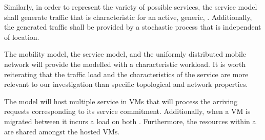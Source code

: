 Similarly, in order to represent the variety of possible services, the service model shall generate traffic that is characteristic for an active, generic, \ue{}. Additionally, the generated traffic shall be provided by a stochastic process that is independent of location.

The mobility model, the service model, and the uniformly distributed mobile network will provide the modelled \dcs{} with a characteristic workload. It is worth reiterating that the traffic load and the characteristics of the service are more relevant to our investigation than specific topological and network properties.

The \dc{} model will host multiple service in VMs that will process the arriving requests corresponding to its service commitment. Additionally, when a VM is migrated between \dcs{} it incurs a load on both \dcs{}. Furthermore, the resources within a \dc{} are shared amongst the hosted VMs. %
